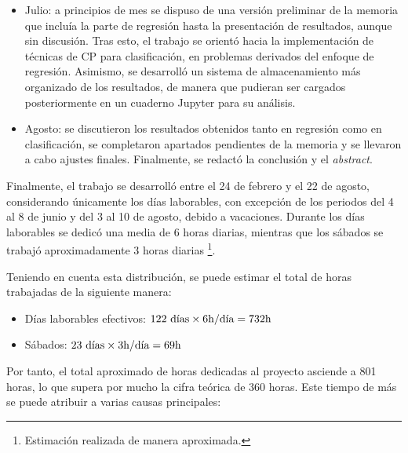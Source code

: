 \begin{itemize}
    \item Julio: a principios de mes se dispuso de una versión preliminar de la memoria que incluía la parte de regresión hasta la presentación de resultados, aunque sin discusión. Tras esto, el trabajo se orientó hacia la implementación de técnicas de \acrshort{CP} para clasificación, en problemas derivados del enfoque de regresión. Asimismo, se desarrolló un sistema de almacenamiento más organizado de los resultados, de manera que pudieran ser cargados posteriormente en un cuaderno Jupyter para su análisis.

    \item Agosto: se discutieron los resultados obtenidos tanto en regresión como en clasificación, se completaron apartados pendientes de la memoria y se llevaron a cabo ajustes finales. Finalmente, se redactó la conclusión y el \textit{abstract}.
    
\end{itemize}

Finalmente, el trabajo se desarrolló entre el 24 de febrero y el 22 de agosto, considerando únicamente los días laborables, con excepción de los periodos del 4 al 8 de junio y del 3 al 10 de agosto, debido a vacaciones. Durante los días laborables se dedicó una media de 6 horas diarias, mientras que los sábados se trabajó aproximadamente 3 horas diarias%
\footnote{Estimación realizada de manera aproximada.}.

Teniendo en cuenta esta distribución, se puede estimar el total de horas trabajadas de la siguiente manera:

\begin{itemize}
    \item Días laborables efectivos: $122\textnormal{ días} \times 6\textnormal{h/día} = 732\textnormal{h}$
    \item Sábados: $23\textnormal{ días} \times 3\textnormal{h/día} = 69\textnormal{h}$
\end{itemize}

Por tanto, el total aproximado de horas dedicadas al proyecto asciende a 801 horas, lo que supera por mucho la cifra teórica de 360 horas. Este tiempo de más se puede atribuir a varias causas principales: 

